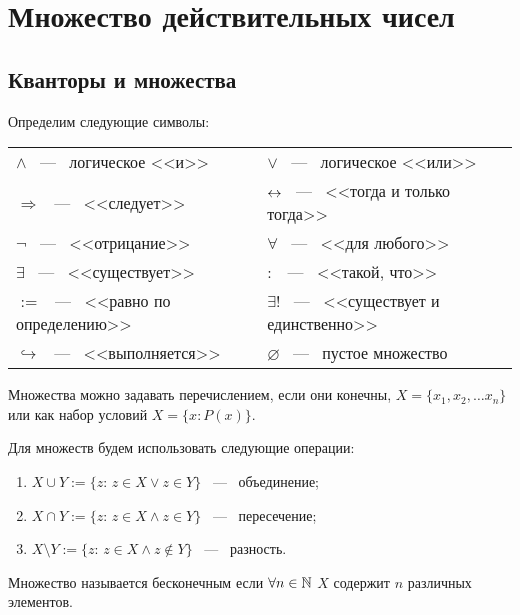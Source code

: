 \section{Множество действительных чисел}

    \subsection{Кванторы и множества}

    Определим следующие символы: 

    \begin{center}
    \begin{tabular}{ll}
        $\wedge$ ~---~ логическое <<и>>       & $\vee$ ~---~ логическое <<или>>     \\
        $\Rightarrow$ ~---~ <<следует>>      &    $\leftrightarrow$ ~---~ <<тогда и только тогда>>             \\
          $\lnot$ ~---~ <<отрицание>>           &    $\forall$ ~---~ <<для любого>>                  \\
           $\exists$ ~---~ <<существует>>          &       $:$ ~---~ <<такой, что>>               \\
    $:=$ ~---~ <<равно по определению>> & $\exists !$ ~---~ <<существует и единственно>> \\
    $\hookrightarrow$ ~---~ <<выполняется>> & $\varnothing$ ~---~ пустое множество
    \end{tabular}
    \end{center}

    Множества можно задавать перечислением, если они конечны,
    $X = \{ x_{1}, x_{2}, \dots x_{n} \}$ или как набор условий $X = \{ x: P(x) \} .$

    Для множеств будем использовать следующие операции:

    \begin{enumerate}
        \item $X \cup Y := \{ z$: $z \in X \vee z \in Y \}$ ~---~ объединение;

        \item $X \cap Y := \{ z$: $z \in X \wedge z \in Y \}$ ~---~ пересечение;

        \item $X\setminus\text{}Y := \{ z$: $z \in X \wedge z \notin Y \}$ ~---~ разность.
    \end{enumerate}
    
    
    \begin{definition}
	   Множество называется бесконечным если $\forall n \in \mathbb{N}$ $X$ содержит $n$ различных элементов. 
    \end{definition}

